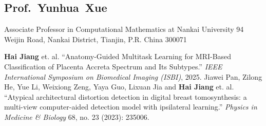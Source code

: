 \documentclass[11pt,a4paper, final]{moderncv}
\newcommand{\spacesubsection}{\vspace{0.2cm}}
\begin{document}
	\subsection{Prof.~Yunhua~Xue}
		\cvline{}
		{Associate Professor in Computational Mathematics at Nankai University}
		{94 Weijin Road, Nankai District, Tianjin, P.R. China 300071}





\clearpage
{}
\nocite{*}

	\begin{thebibliography}{99}
		\bibitem[1]{} 
					\textbf{Hai Jiang} et. al. 
					``Anatomy-Guided Multitask Learning for MRI-Based Classification of Placenta Accreta Spectrum and Its Subtypes.'' 
					\emph{IEEE International Symposium on Biomedical Imaging (ISBI)}, 2025.
		\bibitem[2]{} 
					Jiawei Pan, Zilong He, Yue Li, Weixiong Zeng, Yaya Guo, Lixuan Jia and \textbf{Hai Jiang} et. al. 
					``Atypical architectural distortion detection in digital breast tomosynthesis: a multi-view computer-aided detection model with ipsilateral learning.'' 
					\emph{Physics in Medicine \& Biology} 68, no. 23 (2023): 235006.
	\end{thebibliography}
% 
\end{document}
